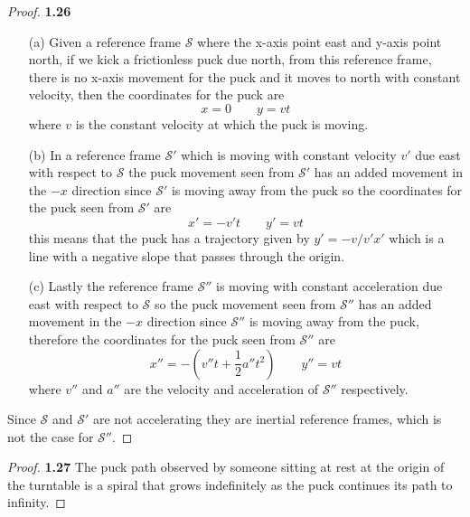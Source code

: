 \documentclass[11pt]{article}
\begin{document}
        \begin{proof}{\textbf{1.26}}
            \begin{itemize}
            \item[(a)] Given a reference frame $\mathscr{S}$ where the x-axis
            point east and y-axis point north, if we kick a frictionless puck
            due north, from this reference frame, there is no x-axis movement
            for the puck and it moves to north with constant velocity, then
            the coordinates for the puck are
            $$x = 0 \quad\quad y = vt$$
            where $v$ is the constant velocity at which the puck is moving.
            \item[(b)] In a reference frame $\mathscr{S'}$ which is moving
            with constant velocity $v'$ due east with respect to
            $\mathscr{S}$ the puck movement seen from $\mathscr{S'}$ has an
            added movement in the $-x$ direction since $\mathscr{S'}$ is moving
            away from the puck so the coordinates for the puck seen from
            $\mathscr{S'}$ are 
            $$x' = -v't \quad\quad y' = vt$$
            this means that the puck has a trajectory given by $y' = -v/v' x'$
            which is a line with a negative slope that passes through the origin.
            \item[(c)] Lastly the reference frame $\mathscr{S''}$ is moving
            with constant acceleration due east with respect to $\mathscr{S}$
            so the puck movement seen from $\mathscr{S''}$ has an added
            movement in the $-x$ direction since $\mathscr{S''}$ is moving
            away from the puck, therefore the coordinates for the puck seen from
            $\mathscr{S''}$ are
            $$x'' = -(v''t + \frac{1}{2}a''t^2) \quad\quad y'' = vt$$
            where $v''$ and $a''$ are the velocity and acceleration of
            $\mathscr{S''}$ respectively. 
            \end{itemize}
            Since $\mathscr{S}$ and $\mathscr{S'}$ are not accelerating they
            are inertial reference frames, which is not the case for
            $\mathscr{S''}$.
        \end{proof}
        \begin{proof}{\textbf{1.27}}
            The puck path observed by someone sitting at rest at the origin of
            the turntable is a spiral that grows indefinitely as the puck
            continues its path to infinity. 
        \end{proof}
\end{document}
